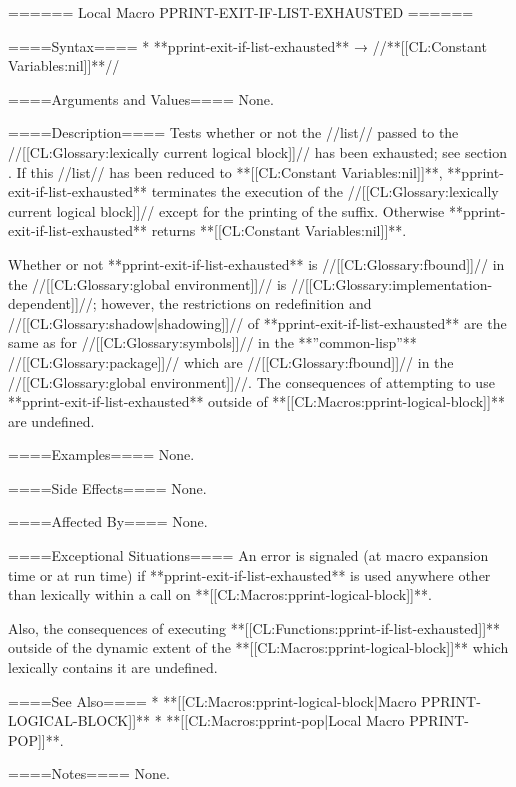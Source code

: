 ====== Local Macro PPRINT-EXIT-IF-LIST-EXHAUSTED ======

====Syntax====
  * **pprint-exit-if-list-exhausted** → //**[[CL:Constant Variables:nil]]**//

====Arguments and Values====
None.

====Description====
Tests whether or not the //list// passed to the //[[CL:Glossary:lexically current logical block]]// has been exhausted; see section {\secref\DynamicControlofOutput}. If this //list// has been reduced to **[[CL:Constant Variables:nil]]**, **pprint-exit-if-list-exhausted** terminates the execution of the //[[CL:Glossary:lexically current logical block]]// except for the printing of the suffix. Otherwise **pprint-exit-if-list-exhausted** returns **[[CL:Constant Variables:nil]]**.

Whether or not **pprint-exit-if-list-exhausted** is //[[CL:Glossary:fbound]]// in the //[[CL:Glossary:global environment]]// is //[[CL:Glossary:implementation-dependent]]//; however, the restrictions on redefinition and //[[CL:Glossary:shadow|shadowing]]// of **pprint-exit-if-list-exhausted** are the same as for //[[CL:Glossary:symbols]]// in the **''common-lisp''** //[[CL:Glossary:package]]// which are //[[CL:Glossary:fbound]]// in the //[[CL:Glossary:global environment]]//. The consequences of attempting to use **pprint-exit-if-list-exhausted** outside of **[[CL:Macros:pprint-logical-block]]** are undefined.

====Examples====
None.

====Side Effects====
None.

====Affected By====
None.

====Exceptional Situations====
An error is signaled (at macro expansion time or at run time) if **pprint-exit-if-list-exhausted** is used anywhere other than lexically within a call on **[[CL:Macros:pprint-logical-block]]**.

Also, the consequences of executing **[[CL:Functions:pprint-if-list-exhausted]]** outside of the dynamic extent of the **[[CL:Macros:pprint-logical-block]]** which lexically contains it are undefined.

====See Also====
  * **[[CL:Macros:pprint-logical-block|Macro PPRINT-LOGICAL-BLOCK]]**
  * **[[CL:Macros:pprint-pop|Local Macro PPRINT-POP]]**.

====Notes====
None.

 

